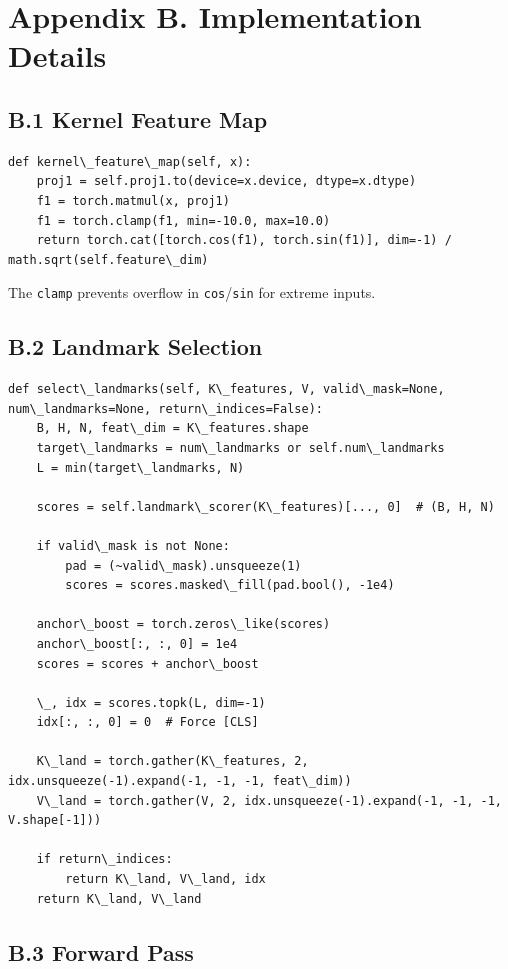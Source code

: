 \section{Appendix B. Implementation Details}

\subsection{B.1 Kernel Feature Map}

\begin{lstlisting}
def kernel\_feature\_map(self, x):
    proj1 = self.proj1.to(device=x.device, dtype=x.dtype)
    f1 = torch.matmul(x, proj1)
    f1 = torch.clamp(f1, min=-10.0, max=10.0)
    return torch.cat([torch.cos(f1), torch.sin(f1)], dim=-1) / math.sqrt(self.feature\_dim)
\end{lstlisting}

The \texttt{clamp} prevents overflow in \texttt{cos}/\texttt{sin} for extreme inputs.

\subsection{B.2 Landmark Selection}

\begin{lstlisting}
def select\_landmarks(self, K\_features, V, valid\_mask=None, num\_landmarks=None, return\_indices=False):
    B, H, N, feat\_dim = K\_features.shape
    target\_landmarks = num\_landmarks or self.num\_landmarks
    L = min(target\_landmarks, N)
    
    scores = self.landmark\_scorer(K\_features)[..., 0]  # (B, H, N)
    
    if valid\_mask is not None:
        pad = (~valid\_mask).unsqueeze(1)
        scores = scores.masked\_fill(pad.bool(), -1e4)
    
    anchor\_boost = torch.zeros\_like(scores)
    anchor\_boost[:, :, 0] = 1e4
    scores = scores + anchor\_boost
    
    \_, idx = scores.topk(L, dim=-1)
    idx[:, :, 0] = 0  # Force [CLS]
    
    K\_land = torch.gather(K\_features, 2, idx.unsqueeze(-1).expand(-1, -1, -1, feat\_dim))
    V\_land = torch.gather(V, 2, idx.unsqueeze(-1).expand(-1, -1, -1, V.shape[-1]))
    
    if return\_indices:
        return K\_land, V\_land, idx
    return K\_land, V\_land
\end{lstlisting}

\subsection{B.3 Forward Pass}

